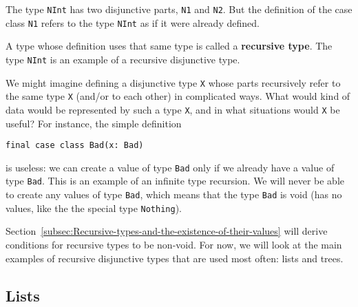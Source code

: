 \noindent The type \lstinline!NInt! has two disjunctive parts, \lstinline!N1!
and \lstinline!N2!. But the definition of the case class \lstinline!N1!
refers to the type \lstinline!NInt! as if it were already defined. 

A type whose definition uses that same type is called a \textbf{recursive
type}. The type \lstinline!NInt! is an example of a recursive disjunctive
type.

We might imagine defining a disjunctive type \lstinline!X! whose
parts recursively refer to the same type \lstinline!X! (and/or to
each other) in complicated ways. What would kind of data would be
represented by such a type \lstinline!X!, and in what situations
would \lstinline!X! be useful? For instance, the simple definition
\begin{lstlisting}
final case class Bad(x: Bad)
\end{lstlisting}
is useless: we can create a value of type \lstinline!Bad! only if
we already have a value of type \lstinline!Bad!. This is an example
of an infinite type recursion. We
will never be able to create any values of type \lstinline!Bad!,
which means that the type \lstinline!Bad! is void
(has no values, like the the special type \lstinline!Nothing!). 

Section~\ref{subsec:Recursive-types-and-the-existence-of-their-values}
will derive conditions for recursive types to be non-void. For now,
we will look at the main examples of recursive disjunctive types that
are used most often: lists and trees.

\subsection{Lists}

